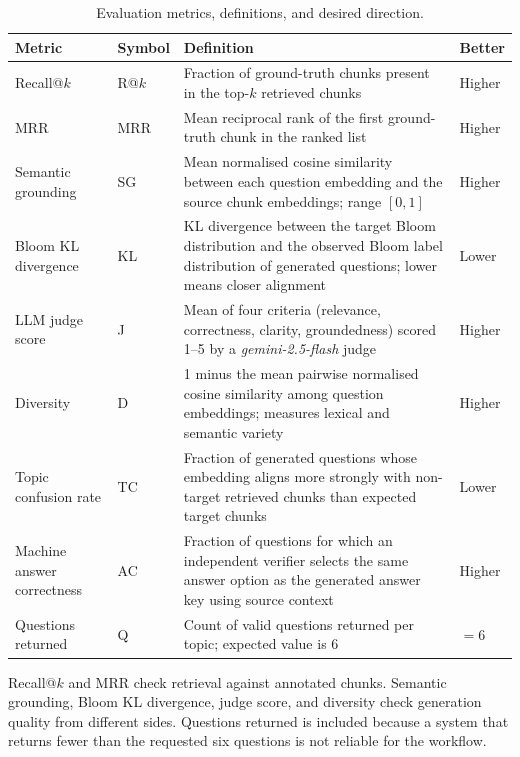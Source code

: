 \documentclass[12pt,a4paper]{article}
\begin{document}
\begin{table}[H]
  \centering
  \singlespacing
  \caption{Evaluation metrics, definitions, and desired direction.}
  \label{tab:metrics}
  \begin{tabular}{@{}p{3.1cm}p{1.2cm}p{6.1cm}p{1.2cm}@{}}
    \toprule
    \textbf{Metric} & \textbf{Symbol} & \textbf{Definition} & \textbf{Better} \\
    \midrule
    Recall@$k$ & R@$k$ &
      Fraction of ground-truth chunks present in the top-$k$ retrieved chunks &
      Higher \\
    MRR & MRR &
      Mean reciprocal rank of the first ground-truth chunk in the ranked list &
      Higher \\
    Semantic grounding & SG &
      Mean normalised cosine similarity between each question embedding and the
      source chunk embeddings; range $[0, 1]$ &
      Higher \\
    Bloom KL divergence & KL &
      KL divergence between the target Bloom distribution and the observed
      Bloom label distribution of generated questions; lower means closer
      alignment &
      Lower \\
    LLM judge score & J &
      Mean of four criteria (relevance, correctness, clarity, groundedness)
      scored 1--5 by a \textit{gemini-2.5-flash} judge &
      Higher \\
    Diversity & D &
      1 minus the mean pairwise normalised cosine similarity among question
      embeddings; measures lexical and semantic variety &
      Higher \\
    Topic confusion rate & TC &
      Fraction of generated questions whose embedding aligns more strongly
      with non-target retrieved chunks than expected target chunks &
      Lower \\
    Machine answer correctness & AC &
      Fraction of questions for which an independent verifier selects the
      same answer option as the generated answer key using source context &
      Higher \\
    Questions returned & Q &
      Count of valid questions returned per topic; expected value is 6 &
      $= 6$ \\
    \bottomrule
  \end{tabular}
\end{table}

Recall@$k$ and MRR check retrieval against annotated chunks. Semantic
grounding, Bloom KL divergence, judge score, and diversity check generation
quality from different sides. Questions returned is included because a
system that returns fewer than the requested six questions is not reliable
for the workflow.
\end{document}
